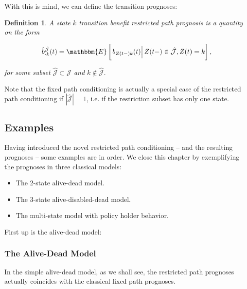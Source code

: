 \documentclass{article}
\newcommand{\1}[1]{\mathbbm{1}_{\left\lbrace #1 \right\rbrace}}
\newcommand{\econd}[2][def]{\mathbbm{E} \left[ \left. #1 \right| #2 \right]}
\theoremstyle{break}
\newtheorem{definition}{Definition}[section]
\theoremstyle{remark}
\newenvironment{remark}
  {\pushQED{\qed}\renewcommand{\qedsymbol}{\scalebox{1.4}{$\circ$}}\remarkx}
  {\popQED\endremarkx}
\numberwithin{equation}{section}
\begin{document}
With this is mind, we can define the transition prognoses:

\begin{definition} \label{DefTraRestr}
	A state $k$ transition benefit restricted path prognosis is a quantity on the form
	
	\begin{gather*}
		\hat{b}_{\cdot k}^{\hat{\mathcal{J}}}(t) = \econd[b_{Z(t-)k}(t)]{Z(t-) \in \hat{\mathcal{J}}, Z(t)=k},
	\end{gather*}
	
	for some subset $\hat{\mathcal{J}} \subset \mathcal{J}$ and $k \notin \hat{\mathcal{J}}$.
\end{definition}

\begin{remark} \label{FixedRestricted}
	Note that the fixed path conditioning is actually a special case of the restricted path conditioning if $|\hat{\mathcal{J}}|=1$, i.e. if the restriction subset has only one state.
\end{remark}

\newpage

\subsection{Examples} \label{SectExa}

Having introduced the novel restricted path conditioning -- and the resulting prognoses -- some examples are in order. We close this chapter by exemplifying the prognoses in three classical models:

\begin{itemize}
	\item The 2-state alive-dead model.
	\item The 3-state alive-disabled-dead model.
	\item The multi-state model with policy holder behavior.
\end{itemize}

First up is the alive-dead model:

\subsubsection{The Alive-Dead Model} \label{ExampleOne}
In the simple alive-dead model, as we shall see, the restricted path prognoses actually coincides with the classical fixed path prognoses.
\end{document}

